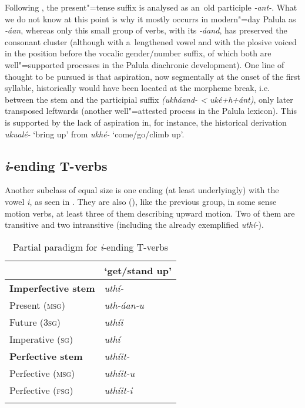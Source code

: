 Following \citet[22]{morgenstierne1941}, the present"=tense suffix is analysed as an~old participle \textit{-ant-}. What we do not know at this point is why it mostly occurrs in modern"=day Palula as \textit{-áan}, whereas only this small group of verbs, with its \textit{-áand}, has preserved the consonant cluster (although with a~lengthened vowel and with the plosive voiced in the position before the vocalic gender/number suffix, of which both are well"=supported processes in the Palula diachronic development). One line of thought to be pursued is that aspiration, now segmentally at the onset of the first syllable, historically would have been located at the morpheme break, i.e. between the stem and the participial suffix \textit{(ukháand- {\textless} uké+h+ánt)}, only later transposed leftwards (another well"=attested process in the Palula lexicon). This is supported by the lack of aspiration in, for instance, the historical derivation \textit{ukualé-} `bring up' from \textit{ukhé-} `come/go/climb up'.


\subsection{\textit{i}-ending T-verbs}
\label{subsec:8-3-9}


Another subclass of equal size is one ending (at least underlyingly) with the vowel \textit{i}, as seen in . They are also (), like the previous group, in some sense motion verbs, at least three of them describing upward motion. Two of them are transitive and two intransitive (including the already exemplified \textit{uthí-}).


\begin{table} 
\caption{Partial paradigm for \textit{i}-ending T-verbs}
\begin{tabularx}{.75\textwidth}{ Q Q }
\lsptoprule
&
\textbf{`get/stand up'}\\\midrule
\textbf{Imperfective stem} &
\textit{uthí-} \\
Present (\textsc{msg}) &
\textit{uth-áan-u} \\
Future (\textsc{3sg}) &
\textit{uthíi} \\
Imperative (\textsc{sg}) &
\textit{uthí} \\
\textbf{Perfective stem} &
\textit{uthíit-} \\
Perfective (\textsc{msg}) &
\textit{uthíit-u} \\
Perfective (\textsc{fsg}) &
\textit{uthíit-i} \\\lspbottomrule
\end{tabularx}
\label{tab:8-11}
\end{table}


